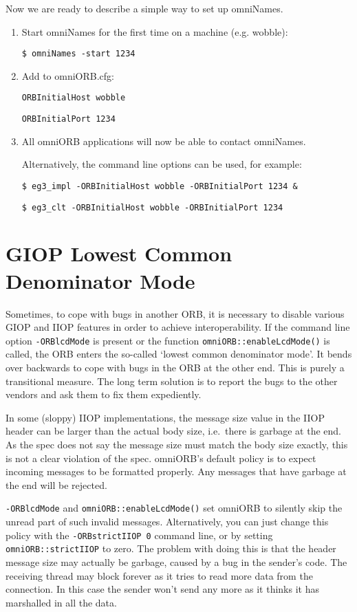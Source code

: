 \documentclass[11pt,twoside,a4paper]{book}
\newcommand{\code}[1]{\texttt{#1}}
\newcommand{\op}[1]{\texttt{#1()}}
\newcommand{\cmdline}[1]{\texttt{#1}}
\newcommand{\dsc}{\discretionary{}{}{}}
\begin{document}
Now we are ready to describe a simple way to set up omniNames.

\begin{enumerate}
\item Start omniNames for the first time on a machine (e.g. wobble):

{\tt \$ omniNames -start 1234}

\item Add to omniORB.cfg:

{\tt ORBInitialHost wobble}

{\tt ORBInitialPort 1234}

\item All omniORB applications will now be able to contact omniNames.

Alternatively, the command line options can be used, for example:

{\tt \$ eg3\_impl -ORBInitialHost wobble -ORBInitialPort 1234 \&}

{\tt \$ eg3\_clt -ORBInitialHost wobble -ORBInitialPort 1234}

\end{enumerate}




\section{GIOP Lowest Common Denominator Mode}
\label{sec_lcd}
\label{sec:strictIIOP}

Sometimes, to cope with bugs in another ORB, it is necessary to
disable various GIOP and IIOP features in order to achieve
interoperability. If the command line option \cmdline{-ORBlcdMode} is
present or the function \op{omniORB::enableLcdMode} is called, the ORB
enters the so-called `lowest common denominator mode'. It bends over
backwards to cope with bugs in the ORB at the other end. This is
purely a transitional measure. The long term solution is to report the
bugs to the other vendors and ask them to fix them expediently.

In some (sloppy) IIOP implementations, the message size value in the
IIOP header can be larger than the actual body size, i.e.\ there is
garbage at the end. As the spec does not say the message size must
match the body size exactly, this is not a clear violation of the
spec. omniORB's default policy is to expect incoming messages to be
formatted properly. Any messages that have garbage at the end will be
rejected.

\cmdline{-ORBlcdMode} and \op{omniORB::enableLcdMode} set omniORB to
silently skip the unread part of such invalid messages. Alternatively,
you can just change this policy with the \cmdline{-ORBstrictIIOP 0}
command line, or by setting \code{omniORB::\dsc{}strictIIOP} to zero.
The problem with doing this is that the header message size may
actually be garbage, caused by a bug in the sender's code. The
receiving thread may block forever as it tries to read more data from
the connection. In this case the sender won't send any more as it
thinks it has marshalled in all the data.
\end{document}
